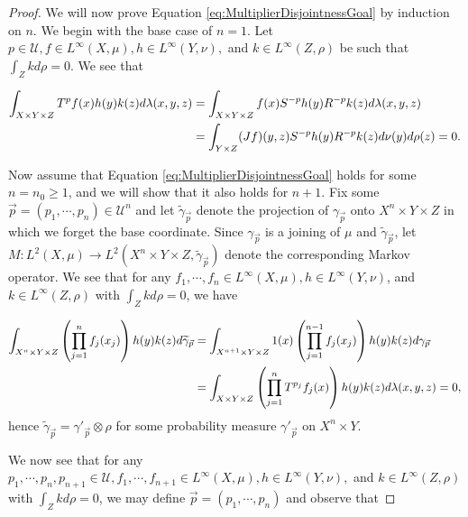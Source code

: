 \documentclass[graybox]{svmult}
\theoremstyle{definition}
\begin{document}
\begin{proof}
    We will now prove Equation \ref{eq:MultiplierDisjointnessGoal} by induction on $n$.
    We begin with the base case of $n = 1$.
    Let $p \in \mathcal{U}, f \in L^\infty(X,\mu), h \in L^\infty(Y,\nu),$ and $k \in L^\infty(Z,\rho)$ be such that $\int_Zkd\rho = 0$.
    We see that

    \begin{alignat}{2}
        \int_{X\times Y\times Z}T^pf(x)h(y)k(z)d\lambda(x,y,z) &= \int_{X\times Y\times Z}f(x)S^{-p}h(y)R^{-p}k(z)d\lambda(x,y,z)\\
        &= \int_{Y\times Z}(Jf)(y,z)S^{-p}h(y)R^{-p}k(z)d\nu(y)d\rho(z) = 0.\notag
    \end{alignat}

    Now assume that Equation \eqref{eq:MultiplierDisjointnessGoal} holds for some $n = n_0 \ge 1$, and we will show that it also holds for $n+1$.
    Fix some $\vec{p} = (p_1,\cdots,p_n) \in \mathcal{U}^n$ and let $\widetilde{\gamma}_{\vec{p}}$ denote the projection of $\gamma_{{\vec p}}$ onto $X^n\times Y\times Z$ in which we forget the base coordinate.
    Since $\gamma_{{\vec p}}$ is a joining of $\mu$ and $\widetilde{\gamma}_{{\vec p}}$, let $M:L^2(X,\mu)\rightarrow L^2(X^n\times Y\times Z,\widetilde{\gamma}_{{\vec p}})$ denote the corresponding Markov operator.
    We see that for any $f_1,\cdots,f_n \in L^\infty(X,\mu), h \in L^\infty(Y,\nu)$, and $k \in L^\infty(Z,\rho)$ with $\int_Zkd\rho = 0$, we have

    \begin{alignat}{2}
        \int_{X^n\times Y\times Z}\left(\prod_{j = 1}^nf_j(x_j)\right)h(y)k(z)d\widetilde{\gamma}_{{\vec p}} &= \int_{X^{n+1}\times Y\times Z}1(x)\left(\prod_{j = 1}^{n-1}f_j(x_j)\right)h(y)k(z)d\gamma_{{\vec p}}\\
        &= \int_{X\times Y\times Z}\left(\prod_{j = 1}^nT^{p_j}f_j(x)\right)h(y)k(z)d\lambda(x,y,z) = 0,\notag
    \end{alignat}
    hence $\widetilde{\gamma}_{\vec{p}} = \gamma'_{\vec{p}}\otimes\rho$ for some probability measure $\gamma'_{\vec{p}}$ on $X^{n}\times Y$.

    We now see that for any $p_1,\cdots,p_n,p_{n+1} \in \mathcal{U}, f_1,\cdots,f_{n+1} \in L^\infty(X,\mu), h \in L^\infty(Y,\nu),$ and $k \in L^\infty(Z,\rho)$ with $\int_Zkd\rho = 0$, we may define $\vec{p} = (p_1,\cdots,p_n)$ and observe that


\end{proof}
\end{document}

